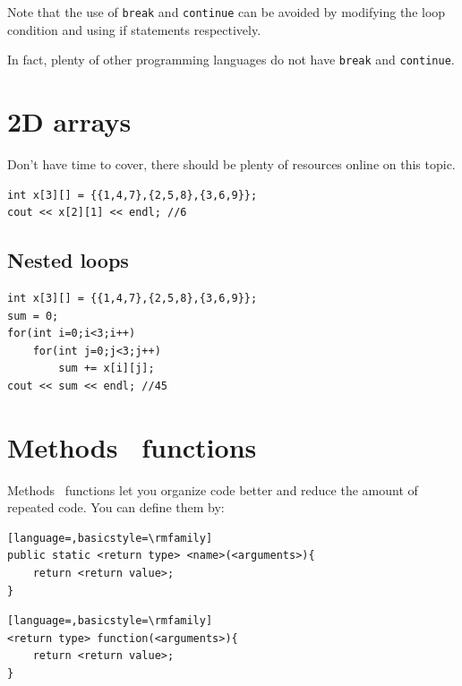 
Note that the use of \texttt{break} and \texttt{continue} can be avoided by modifying the loop condition and using if statements respectively. 

In fact, plenty of other programming languages do not have \texttt{break} and \texttt{continue}. 

\section{2D arrays}

Don't have time to cover, there should be plenty of resources online on this topic.

\begin{lstlisting}
int x[3][] = {{1,4,7},{2,5,8},{3,6,9}};
cout << x[2][1] << endl; //6
\end{lstlisting}

\subsection{Nested loops}

\begin{lstlisting}
int x[3][] = {{1,4,7},{2,5,8},{3,6,9}};
sum = 0;
for(int i=0;i<3;i++)
    for(int j=0;j<3;j++)
        sum += x[i][j];
cout << sum << endl; //45
\end{lstlisting}

\section{\if{} Methods \else ~functions \fi}

\if{} Methods \else ~functions \fi let you organize code better and reduce the amount of repeated code. You can define them by:

\if{}
\begin{lstlisting}[language=,basicstyle=\rmfamily]
public static <return type> <name>(<arguments>){
    return <return value>;
}
\end{lstlisting}
\else
\begin{lstlisting}[language=,basicstyle=\rmfamily]
<return type> function(<arguments>){
    return <return value>;
}
\end{lstlisting}
\fi

